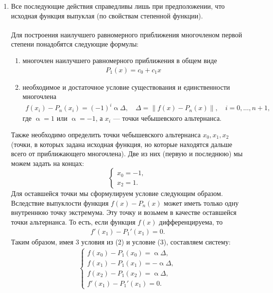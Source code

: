 \documentclass[a4paper, 12pt]{article}
\renewcommand{\alpha}{\upalpha}
\newcommand\Norm[1]{\left\| #1 \right\|}
\begin{document}
\begin{enumerate}
		\newpage
		\item 
		\hypertarget{t2}{}
		Все последующие действия справедливы лишь при предположении, что исходная функция выпуклая (по свойствам степенной функции).\\\\
		Для построения наилучшего равномерного приближения многочленом первой степени понадобятся следующие формулы:
		\begin{enumerate}
			\item многочлен наилучшего равномерного приближения в общем виде \begin{eqnarray}
				P_1(x) = c_0 + c_1x
			\end{eqnarray}
			\item необходимое и достаточное условие существования и единственности многочлена \begin{eqnarray}
				f(x_i) - P_n(x_i) = (-1)^i\alpha\Delta,\quad \Delta = \Norm{f(x) - P_n(x)},\quad i = 0,\ldots,n+1,
			\end{eqnarray}
			где $\alpha=1$ или $\alpha = -1$, а $x_i$ --- точки чебышевского альтернанса.
		\end{enumerate}
		Также необходимо определить точки чебышевского альтернанса $x_0,x_1,x_2$ (точки, в которых задана исходная функция, но которые находятся дальше всего от приближающего многочлена). Две из них (первую и последнюю) мы можем задать на концах:
		$$\begin{cases}
			x_0 = -1,\\
			x_2 = 1.
		\end{cases}$$
		Для оставшейся точки мы сформулируем условие следующим образом. Вследствие выпуклости функция $f(x) - P_n(x)$ может иметь только одну внутреннюю точку экстремума. Эту точку и возьмем в качестве оставшейся точки альтернанса. То есть, если функция $f(x)$ дифференцируема, то  \begin{eqnarray}
			f'(x_1) - P_1'(x_1) = 0.
		\end{eqnarray}
		Таким образом, имея 3 условия из (2) и условие (3), составляем систему:
		\begin{eqnarray}
			\begin{cases}
				f(x_0) - P_1(x_0) = \alpha\Delta,\\
				f(x_1) - P_1(x_1) = -\alpha\Delta,\\
				f(x_2) - P_1(x_2) = \alpha\Delta,\\
				f'(x_1) - P_1'(x_1) = 0.
			\end{cases}
		\end{eqnarray}

\end{enumerate}
\end{document}
